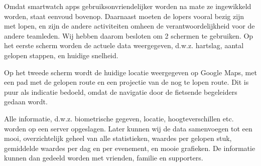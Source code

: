 \documentclass[../main.tex]{subfiles}
\begin{document}
Omdat smartwatch apps gebruiksonvriendelijker worden na mate ze ingewikkeld worden, staat eenvoud bovenop. Daarnaast moeten de lopers vooral bezig zijn met lopen, en zijn de andere activiteiten omheen de verantwoordelijkheid voor de andere teamleden.
Wij hebben daarom besloten om 2 schermen te gebruiken. Op het eerste scherm worden de actuele data weergegeven, d.w.z. hartslag, aantal gelopen stappen, en huidige snelheid.

Op het tweede scherm wordt de huidige locatie weergegeven op Google Maps, met een pad met de gelopen route en een projectie van de nog te lopen route. Dit is puur als indicatie bedoeld, omdat de navigatie door de fietsende begeleiders gedaan wordt.

Alle informatie, d.w.z. biometrische gegeven, locatie, hoogteverschillen etc. worden op een server opgeslagen. Later kunnen wij de data samenvoegen tot een mooi, overzichtelijk geheel van alle statistieken, waardes per gelopen stuk, gemiddelde waardes per dag en per evenement, en mooie grafieken. De informatie kunnen dan gedeeld worden met vrienden, familie en supporters.
\end{document}
